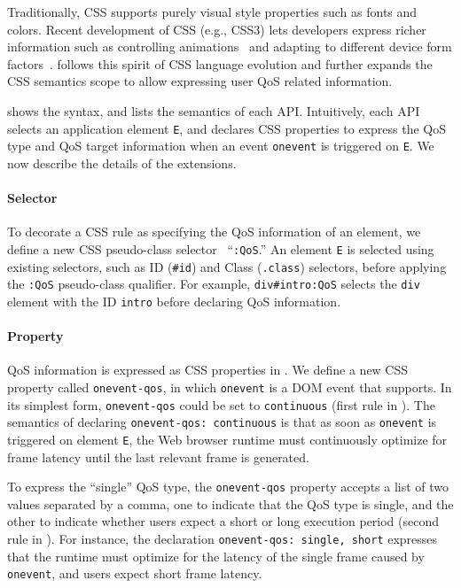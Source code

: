 Traditionally, CSS supports purely visual style properties such as fonts and colors. Recent development of CSS (e.g., CSS3) lets developers express richer information such as controlling animations~\cite{cssanimations} and adapting to different device form factors~\cite{css3mediaquery}. \greenweb follows this spirit of CSS language evolution and further expands the CSS semantics scope to allow expressing user QoS related information.

 shows the \greenweb syntax, and  lists the semantics of each API. Intuitively, each \greenweb API selects an application element \texttt{E}, and declares CSS properties to express the QoS type and QoS target information when an event \texttt{onevent} is triggered on \texttt{E}. We now describe the details of the \greenweb extensions.

\paragraph{Selector} To decorate a CSS rule as specifying the QoS information of an element, we define a new CSS pseudo-class selector~\cite{css_pseudo_class} ``\texttt{:QoS}.'' An element \texttt{E} is selected using existing selectors, such as ID (\texttt{\#id}) and Class (\texttt{.class}) selectors, before applying the \texttt{:QoS} pseudo-class qualifier. For example, \texttt{div\#intro:QoS} selects the \texttt{div} element with the ID \texttt{intro} before declaring QoS information.

\paragraph{Property} QoS information is expressed as CSS properties in \greenweb. We define a new CSS property called \texttt{onevent-qos}, in which \texttt{onevent} is a DOM event that \greenweb supports. In its simplest form, \texttt{onevent-qos} could be set to \texttt{continuous} (first rule in ). The semantics of declaring \texttt{onevent-qos: continuous} is that as soon as \texttt{onevent} is triggered on element \texttt{E}, the Web browser runtime must continuously optimize for frame latency until the last relevant frame is generated.

To express the ``single'' QoS type, the \texttt{onevent-qos} property accepts a list of two values separated by a comma, one to indicate that the QoS type is single, and the other to indicate whether users expect a short or long execution period (second rule in ). For instance, the declaration \texttt{onevent-qos: single, short} expresses that the runtime must optimize for the latency of the single frame caused by \texttt{onevent}, and users expect short frame latency.

